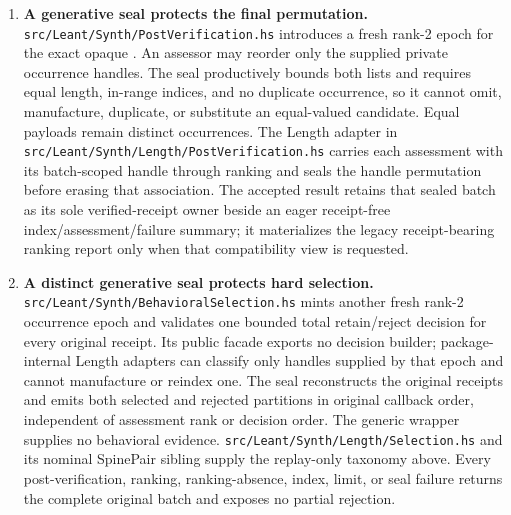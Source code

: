 \documentclass[10pt,letterpaper,oneside]{report}
\newcommand{\code}[1]{\texttt{\detokenize{#1}}}
\newcommand{\filepath}[1]{\nolinkurl{#1}}
\begin{document}
\begin{enumerate}
  \item \textbf{A generative seal protects the final permutation.} \filepath{src/Leant/Synth/PostVerification.hs} introduces a fresh rank-2 epoch for the exact opaque \code{VerificationBatch}. An assessor may reorder only the supplied private occurrence handles. The seal productively bounds both lists and requires equal length, in-range indices, and no duplicate occurrence, so it cannot omit, manufacture, duplicate, or substitute an equal-valued candidate. Equal payloads remain distinct occurrences. The Length adapter in \filepath{src/Leant/Synth/Length/PostVerification.hs} carries each assessment with its batch-scoped handle through ranking and seals the handle permutation before erasing that association. The accepted result retains that sealed batch as its sole verified-receipt owner beside an eager receipt-free index/assessment/failure summary; it materializes the legacy receipt-bearing ranking report only when that compatibility view is requested.
  \item \textbf{A distinct generative seal protects hard selection.} \filepath{src/Leant/Synth/BehavioralSelection.hs} mints another fresh rank-2 occurrence epoch and validates one bounded total retain/reject decision for every original receipt. Its public facade exports no decision builder; package-internal Length adapters can classify only handles supplied by that epoch and cannot manufacture or reindex one. The seal reconstructs the original \code{Verified} receipts and emits both selected and rejected partitions in original callback order, independent of assessment rank or decision order. The generic wrapper supplies no behavioral evidence. \filepath{src/Leant/Synth/Length/Selection.hs} and its nominal SpinePair sibling supply the replay-only taxonomy above. Every post-verification, ranking, ranking-absence, index, limit, or seal failure returns the complete original batch and exposes no partial rejection.

\end{enumerate}
\end{document}
